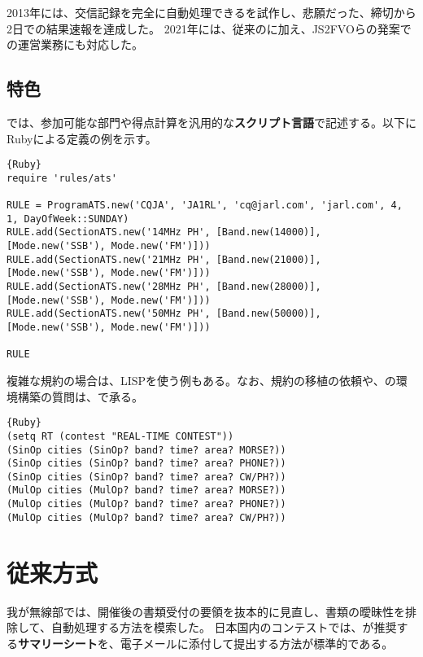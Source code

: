 \documentclass[10pt,a4paper]{book}
\begin{document}
2013年には、交信記録を完全に自動処理できるを試作し、悲願だった、締切から2日での結果速報を達成した。
2021年には、従来の\ja{}に加え、JS2FVOらの発案で\rt{}の運営業務にも対応した。

\section{特色}

では、参加可能な部門や得点計算を汎用的な\textbf{スクリプト言語}で記述する。以下にRubyによる定義の例を示す。

\begin{Verbatim}{Ruby}
require 'rules/ats'

RULE = ProgramATS.new('CQJA', 'JA1RL', 'cq@jarl.com', 'jarl.com', 4, 1, DayOfWeek::SUNDAY)
RULE.add(SectionATS.new('14MHz PH', [Band.new(14000)], [Mode.new('SSB'), Mode.new('FM')]))
RULE.add(SectionATS.new('21MHz PH', [Band.new(21000)], [Mode.new('SSB'), Mode.new('FM')]))
RULE.add(SectionATS.new('28MHz PH', [Band.new(28000)], [Mode.new('SSB'), Mode.new('FM')]))
RULE.add(SectionATS.new('50MHz PH', [Band.new(50000)], [Mode.new('SSB'), Mode.new('FM')]))

RULE
\end{Verbatim}

複雑な規約の場合は、LISPを使う例もある。なお、規約の移植の依頼や、の環境構築の質問は、\todo{}で承る。

\begin{Verbatim}{Ruby}
(setq RT (contest "REAL-TIME CONTEST"))
(SinOp cities (SinOp? band? time? area? MORSE?))
(SinOp cities (SinOp? band? time? area? PHONE?))
(SinOp cities (SinOp? band? time? area? CW/PH?))
(MulOp cities (MulOp? band? time? area? MORSE?))
(MulOp cities (MulOp? band? time? area? PHONE?))
(MulOp cities (MulOp? band? time? area? CW/PH?))
\end{Verbatim}

\chapter{従来方式\label{chap:mail}}

我が無線部では、開催後の書類受付の要領を抜本的に見直し、書類の曖昧性を排除して、自動処理する方法を模索した。
日本国内のコンテストでは、\jarl{}が推奨する\textbf{サマリーシート}を、電子メールに添付して提出する方法が標準的である。
\end{document}
